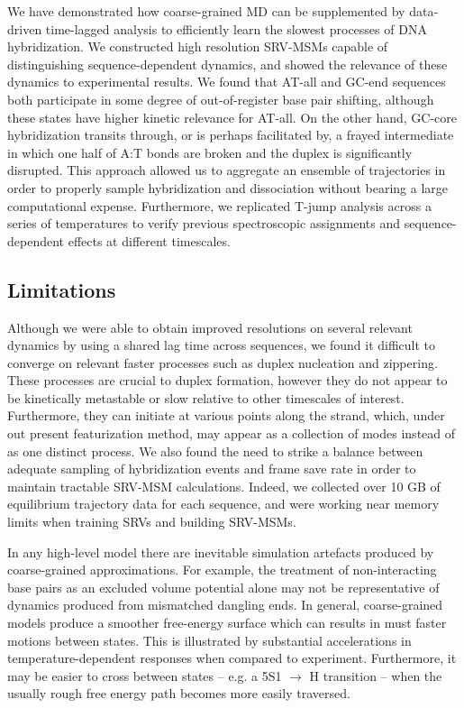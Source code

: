 \documentclass[journal=jpcbfk,manuscript=article]{achemso}
\begin{document}
We have demonstrated how coarse-grained MD can be supplemented by data-driven time-lagged analysis to efficiently learn the slowest processes of DNA hybridization. We constructed high resolution SRV-MSMs capable of distinguishing sequence-dependent dynamics, and showed the relevance of these dynamics to experimental results. We found that AT-all and GC-end sequences both participate in some degree of out-of-register base pair shifting, although these states have higher kinetic relevance for AT-all. On the other hand, GC-core hybridization transits through, or is perhaps facilitated by, a frayed intermediate in which one half of A:T bonds are broken and the duplex is significantly disrupted. This approach allowed us to aggregate an ensemble of trajectories in order to properly sample hybridization and dissociation without bearing a large computational expense. Furthermore, we replicated T-jump analysis across a series of temperatures to verify previous spectroscopic assignments and sequence-dependent effects at different timescales.

\subsection{\label{sec:conc}Limitations} 

Although we were able to obtain improved resolutions on several relevant dynamics by using a shared lag time across sequences, we found it difficult to converge on relevant faster processes such as duplex nucleation and zippering. These processes are crucial to duplex formation, however they do not appear to be kinetically metastable or slow relative to other timescales of interest. Furthermore, they can initiate at various points along the strand, which, under out present featurization method, may appear as a collection of modes instead of as one distinct process. We also found the need to strike a balance between adequate sampling of hybridization events and frame save rate in order to maintain tractable SRV-MSM calculations. Indeed, we collected over 10 GB of equilibrium trajectory data for each sequence, and were working near memory limits when training SRVs and building SRV-MSMs.

In any high-level model there are inevitable simulation artefacts produced by coarse-grained approximations. For example, the treatment of non-interacting base pairs as an excluded volume potential alone may not be representative of dynamics produced from mismatched dangling ends. In general, coarse-grained models produce a smoother free-energy surface which can results in must faster motions between states. This is illustrated by substantial accelerations in temperature-dependent responses when compared to experiment. Furthermore, it may be easier to cross between states -- e.g. a 5S1 $\rightarrow$ H transition -- when the usually rough free energy path becomes more easily traversed. 
\end{document}
